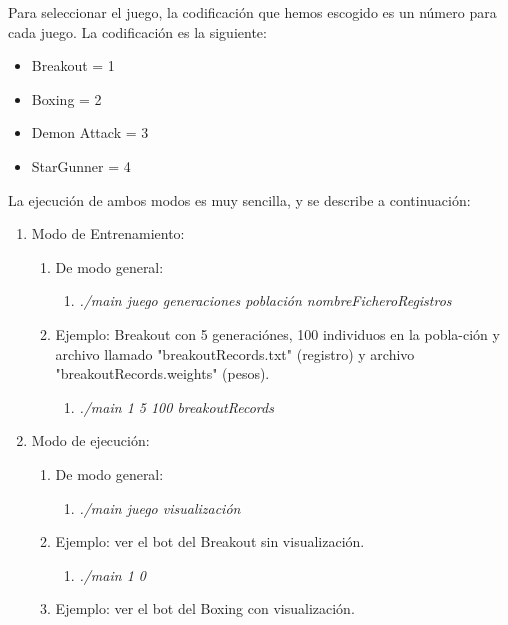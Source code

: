 Para seleccionar el juego, la codificación que hemos escogido es un número para cada juego. La codificación es la siguiente:

\begin{itemize}
    \item Breakout = 1
    \item Boxing = 2
    \item Demon Attack = 3
    \item StarGunner = 4
\end{itemize}

La ejecución de ambos modos es muy sencilla, y se describe a continuación:

\begin{enumerate}
    \item Modo de Entrenamiento: 
    \begin{enumerate}
        \item De modo general:
        \begin{enumerate}
            \item \textit{./main juego generaciones población nombreFicheroRegistros}
        \end{enumerate}
        \item Ejemplo: Breakout con 5 generaciónes, 100 individuos en la pobla-ción y archivo llamado "breakoutRecords.txt" (registro) y archivo "breakoutRecords.weights" (pesos).
        \begin{enumerate}
            \item \textit{./main 1 5 100 breakoutRecords}
        \end{enumerate}
    \end{enumerate}
    \item Modo de ejecución:
    \begin{enumerate}
        \item De modo general:
        \begin{enumerate}
            \item \textit{./main juego visualización}
        \end{enumerate}
        \item Ejemplo: ver el bot del Breakout sin visualización.
        \begin{enumerate}
            \item \textit{./main 1 0}
        \end{enumerate}
        \item Ejemplo: ver el bot del Boxing con visualización.
        \begin{enumerate}

\end{enumerate}
\end{enumerate}
\end{enumerate}

